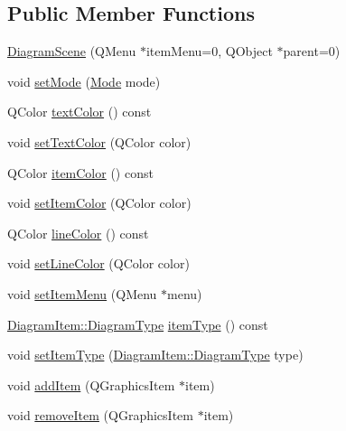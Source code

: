 \subsection*{Public Member Functions}
\begin{DoxyCompactItemize}
\item 
\hyperlink{class_diagram_scene_a1fb0d5ee181479cbb2de281673e6f7b2}{DiagramScene} (QMenu $\ast$itemMenu=0, QObject $\ast$parent=0)
\item 
void \hyperlink{class_diagram_scene_a744ea6890f2e562192a4d3cb913c9766}{setMode} (\hyperlink{class_diagram_scene_a77383a13f4ef28e6617558b1cd5ea52d}{Mode} mode)
\item 
QColor \hyperlink{class_diagram_scene_a09373ee7015d49ce7ccd3cd9983193a7}{textColor} () const 
\item 
void \hyperlink{class_diagram_scene_a94b68899d95483bd7f27d424c0d9d01a}{setTextColor} (QColor color)
\item 
QColor \hyperlink{class_diagram_scene_a48991d2fb5ae136cfefa7489aa3c8b6c}{itemColor} () const 
\item 
void \hyperlink{class_diagram_scene_a1f94fa5fe9f13b4eb1c0512debd689f3}{setItemColor} (QColor color)
\item 
QColor \hyperlink{class_diagram_scene_a2f559c78fb436218c20a15bd5d9b75d7}{lineColor} () const 
\item 
void \hyperlink{class_diagram_scene_a695758bd748aa8004aeec8e642822eed}{setLineColor} (QColor color)
\item 
void \hyperlink{class_diagram_scene_a9a14e8e54b257305b09a5a5cc007d5e3}{setItemMenu} (QMenu $\ast$menu)
\item 
\hyperlink{class_diagram_item_aeda67bf28fac9b4de77086c2bf81407b}{DiagramItem::DiagramType} \hyperlink{class_diagram_scene_af13d33997cd153b2d01b8405d8e5d360}{itemType} () const 
\item 
void \hyperlink{class_diagram_scene_a59a2ab949930f51e4db292aed2e770cd}{setItemType} (\hyperlink{class_diagram_item_aeda67bf28fac9b4de77086c2bf81407b}{DiagramItem::DiagramType} type)
\item 
void \hyperlink{class_diagram_scene_a1262695a1848999fda92750d3ed12861}{addItem} (QGraphicsItem $\ast$item)
\item 
void \hyperlink{class_diagram_scene_af901e53c276b9ed597253489f2fd04cb}{removeItem} (QGraphicsItem $\ast$item)
\end{DoxyCompactItemize}
